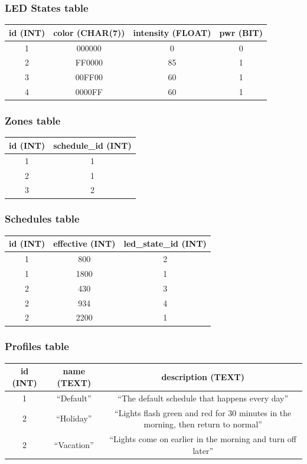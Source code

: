 \documentclass[onecolumn, draftclsnofoot,10pt, compsoc]{IEEEtran}
\begin{document}
			\subsubsection{LED States table}
				\begin{tabular}{ |c|c|c|c| }
					\hline
					id (INT) & color (CHAR(7)) & intensity (FLOAT) & pwr (BIT)\\
					\hline
					1 & 000000 & 0 & 0 \\
					2 & FF0000 & 85 & 1 \\
					3 & 00FF00 & 60 & 1 \\
					4 & 0000FF & 60 & 1 \\
					\hline
				\end{tabular}

			\subsubsection{Zones table}
				\begin{tabular}{ |c|c| }
					\hline
					id (INT) & schedule\_id (INT) \\
					\hline
					1 & 1 \\
					2 & 1 \\
					3 & 2 \\
					\hline
				\end{tabular}

			\subsubsection{Schedules table}
				\begin{tabular}{ |c|c|c| }
					\hline
					id (INT) & effective (INT) & led\_state\_id (INT) \\
					\hline
					1 & 800 & 2 \\
					1 & 1800 & 1 \\
					2 & 430 & 3 \\
					2 & 934 & 4 \\
					2 & 2200 & 1 \\
					\hline
				\end{tabular}

			\subsubsection{Profiles table}
				\begin{tabular}{ |c|c|c| }
					\hline
					id (INT) & name (TEXT) & description (TEXT) \\
					\hline
					1 & ``Default'' & ``The default schedule that happens every day'' \\
					2 & ``Holiday'' & ``Lights flash green and red for 30 minutes in the morning, then return to normal'' \\
					2 & ``Vacation'' & ``Lights come on earlier in the morning and turn off later'' \\
					\hline
				\end{tabular}
\end{document}
